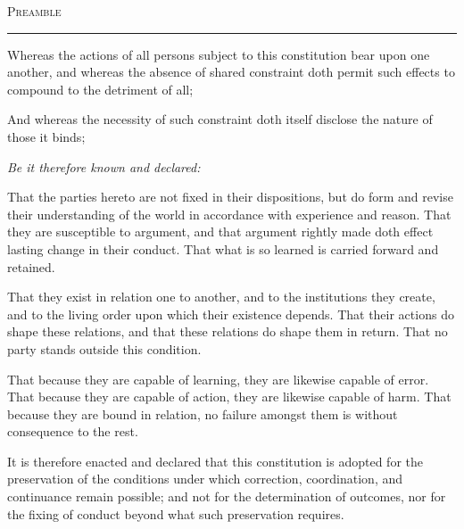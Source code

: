 \documentclass[12pt, a4paper]{article}
\begin{document}
\begin{center}
  {\small\scshape Preamble}\\[0.4em]
  \rule{6cm}{0.4pt}
\end{center}

\vspace{1.8em}


\noindent
Whereas the actions of all persons subject to this constitution bear upon one another,
and whereas the absence of shared constraint doth permit such effects to compound
to the detriment of all;

\vspace{0.8em}

\noindent
And whereas the necessity of such constraint doth itself disclose the nature
of those it binds;

\vspace{1.2em}

\noindent
\textit{Be it therefore known and declared:}

\vspace{1.2em}

\noindent
That the parties hereto are not fixed in their dispositions, but do form and revise
their understanding of the world in accordance with experience and reason.
That they are susceptible to argument, and that argument rightly made doth effect
lasting change in their conduct. That what is so learned is carried forward and retained.

\vspace{0.8em}

\noindent
That they exist in relation one to another, and to the institutions they create,
and to the living order upon which their existence depends. That their actions do
shape these relations, and that these relations do shape them in return.
That no party stands outside this condition.

\vspace{0.8em}

\noindent
That because they are capable of learning, they are likewise capable of error.
That because they are capable of action, they are likewise capable of harm.
That because they are bound in relation, no failure amongst them is without
consequence to the rest.

\vspace{1.2em}

\noindent
It is therefore enacted and declared that this constitution is adopted for the
preservation of the conditions under which correction, coordination, and
continuance remain possible; and not for the determination of outcomes,
nor for the fixing of conduct beyond what such preservation requires.
\end{document}
